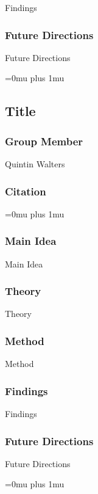 \noindent
Findings

\subsubsection{Future Directions}

\noindent
Future Directions 

\Urlmuskip=0mu plus 1mu\relax

\noindent
\subsection{Title}

\subsubsection{Group Member}

\noindent
Quintin Walters

\noindent
\subsubsection{Citation}

\Urlmuskip=0mu plus 1mu\relax

\subsubsection{Main Idea}

\noindent
Main Idea

\subsubsection{Theory}

\noindent
Theory

\subsubsection{Method}

\noindent
Method

\subsubsection{Findings}

\noindent
Findings

\subsubsection{Future Directions}

\noindent
Future Directions 

\Urlmuskip=0mu plus 1mu\relax
\pagebreak
